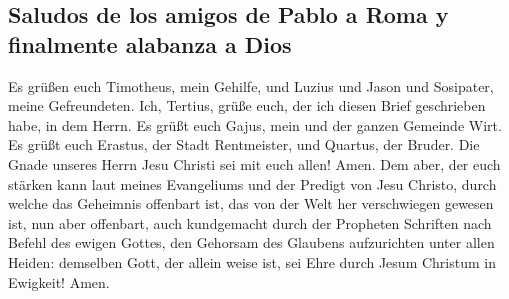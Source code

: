 \hypertarget{saludos-de-los-amigos-de-pablo-a-roma-y-finalmente-alabanza-a-dios}{%
\subsection{Saludos de los amigos de Pablo a Roma y finalmente alabanza
a
Dios}\label{saludos-de-los-amigos-de-pablo-a-roma-y-finalmente-alabanza-a-dios}}

 Es grüßen euch Timotheus, mein Gehilfe, und Luzius und
Jason und Sosipater, meine Gefreundeten.  Ich, Tertius,
grüße euch, der ich diesen Brief geschrieben habe, in dem Herrn.
 Es grüßt euch Gajus, mein und der ganzen Gemeinde Wirt.
Es grüßt euch Erastus, der Stadt Rentmeister, und Quartus, der Bruder.
 Die Gnade unseres Herrn Jesu Christi sei mit euch allen!
Amen.  Dem aber, der euch stärken kann laut meines
Evangeliums und der Predigt von Jesu Christo, durch welche das Geheimnis
offenbart ist, das von der Welt her verschwiegen gewesen ist,
 nun aber offenbart, auch kundgemacht durch der Propheten
Schriften nach Befehl des ewigen Gottes, den Gehorsam des Glaubens
aufzurichten unter allen Heiden:  demselben Gott, der
allein weise ist, sei Ehre durch Jesum Christum in Ewigkeit! Amen.
